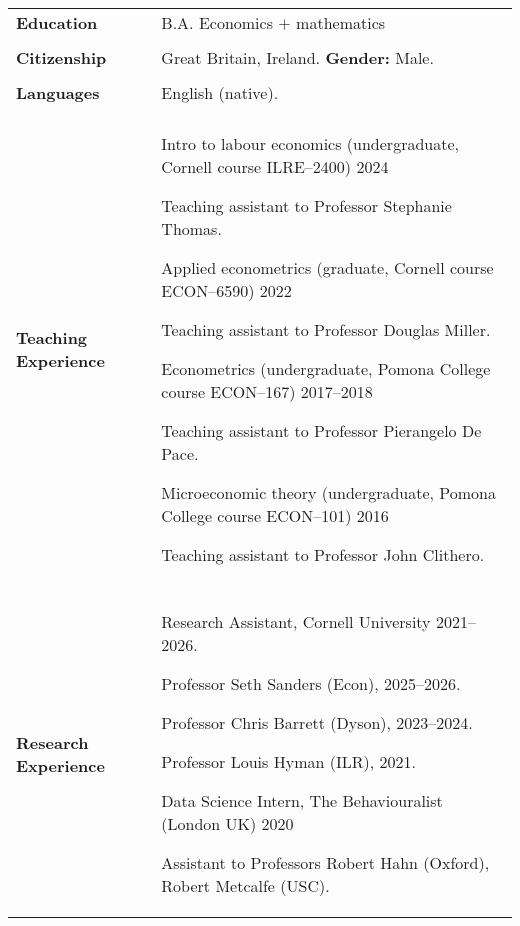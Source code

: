 \documentclass[letterpaper,11pt,oneside]{article}
\begin{document}
\begin{longtable}[\textwidth]{p{} p{}}
\textbf{Education}
    & B.A. Economics $+$ mathematics  \\ \\

\textbf{Citizenship}
    & Great Britain, Ireland. \hfill \textbf{Gender:} Male. \\ \\

\textbf{Languages}
    & English (native). \\ \\
        
\textbf{Teaching Experience}
    & Intro to labour economics (undergraduate, Cornell course ILRE--2400) \hfill 2024

    \indent\hspace{1cm} Teaching assistant to Professor Stephanie Thomas.

    Applied econometrics (graduate, Cornell course ECON--6590) \hfill 2022 
    
    \indent\hspace{1cm} Teaching assistant to Professor Douglas Miller.
    
    Econometrics (undergraduate, Pomona College course ECON--167) \hfill 2017--2018
    
    \indent\hspace{1cm} Teaching assistant to Professor Pierangelo De Pace.

    Microeconomic theory (undergraduate, Pomona College course ECON--101) \hfill 2016

    \indent\hspace{1cm} Teaching assistant to Professor John Clithero. \\ \\

\textbf{Research Experience}
    & Research Assistant, Cornell University \hfill 2021--2026.

    \indent\hspace{1cm} Professor Seth Sanders (Econ), 2025--2026.

    \indent\hspace{1cm} Professor Chris Barrett (Dyson), 2023--2024.

    \indent\hspace{1cm} Professor Louis Hyman (ILR), 2021.

    Data Science Intern, The Behaviouralist (London UK) \hfill 2020

    \indent\hspace{1cm} Assistant to Professors  Robert Hahn (Oxford), Robert Metcalfe (USC).


\end{longtable}
\end{document}
